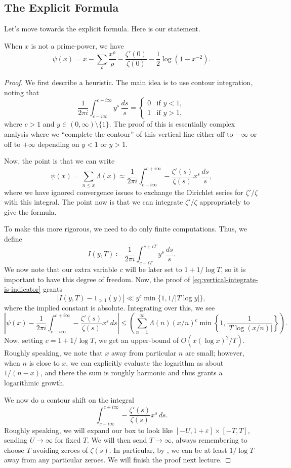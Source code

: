 \documentclass[../notes.tex]{subfiles}
\begin{document}
\subsection{The Explicit Formula}
Let's move towards the explicit formula. Here is our statement.
\begin{theorem}
	When $x$ is not a prime-power, we have
	\[\psi(x)=x-\sum_\rho\frac{x^\rho}\rho-\frac{\zeta'(0)}{\zeta(0)}-\frac12\log\left(1-x^{-2}\right).\]
\end{theorem}
\begin{proof}
	We first describe a heuristic. The main idea is to use contour integration, noting that
	\begin{equation}
		\frac1{2\pi i}\int_{c-i\infty}^{c+i\infty}y^s\,\frac{ds}s=\begin{cases}
			0 & \text{if }y<1, \\
			1 & \text{if }y>1,
		\end{cases} \label{eq:vertical-integrate-is-indicator}
	\end{equation}
	where $c>1$ and $y\in(0,\infty)\setminus\{1\}$. The proof of this is essentially complex analysis where we ``complete the contour'' of this vertical line either off to $-\infty$ or off to $+\infty$ depending on $y<1$ or $y>1$.

	Now, the point is that we can write
	\[\psi(x)=\sum_{n\le x}\Lambda(x)\approx\frac1{2\pi i}\int_{c-i\infty}^{c+i\infty}-\frac{\zeta'(s)}{\zeta(s)}x^s\,\frac{ds}s,\]
	where we have ignored convergence issues to exchange the Dirichlet series for $\zeta'/\zeta$ with this integral. The point now is that we can integrate $\zeta'/\zeta$ appropriately to give the formula.

	To make this more rigorous, we need to do only finite computations. Thus, we define
	\[I(y,T)\coloneqq\frac1{2\pi i}\int_{c-iT}^{c+iT}y^s\,\frac{ds}s.\]
	We now note that our extra variable $c$ will be later set to $1+1/\log T$, so it is important to have this degree of freedom. Now, the proof of \eqref{eq:vertical-integrate-is-indicator} grants
	\[|I(y,T)-1_{>1}(y)|\ll y^c\min\{1,1/|T\log y|\},\]
	where the implied constant is absolute. Integrating over this, we see
	\[\left|\psi(x)-\frac1{2\pi i}\int_{c-i\infty}^{c+i\infty}-\frac{\zeta'(s)}{\zeta(s)}x^s\,ds\right|\le\left(\sum_{n=1}^\infty\Lambda(n)(x/n)^c\min\left\{1,\frac1{|T\log(x/n)|}\right\}\right).\]
	Now, setting $c=1+1/\log T$, we get an upper-bound of $O\left(x(\log x)^2/T\right)$. Roughly speaking, we note that $x$ away from particular $n$ are small; however, when $n$ is close to $x$, we can explicitly evaluate the logarithm as about $1/(n-x)$, and there the sum is roughly harmonic and thus grants a logarithmic growth.

	We now do a contour shift on the integral
	\[\int_{c-i\infty}^{c+i\infty}-\frac{\zeta'(s)}{\zeta(s)}x^s\,ds.\]
	Roughly speaking, we will expand our box to look like $[-U,1+\varepsilon]\times[-T,T]$, sending $U\to\infty$ for fixed $T$. We will then send $T\to\infty$, always remembering to choose $T$ avoiding zeroes of $\zeta(s)$. In particular, by , we can be at least $1/\log T$ away from any particular zeroes. We will finish the proof next lecture.
\end{proof}
\end{document}
